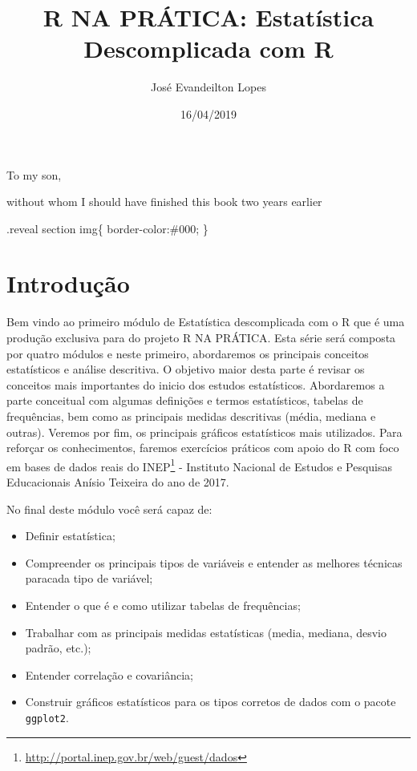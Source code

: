 \documentclass[11pt,]{style/krantz}
\title{R NA PRÁTICA: Estatística Descomplicada com R}
\author{José Evandeilton Lopes}
\date{16/04/2019}
\providecommand{\tightlist}{%
  \setlength{\itemsep}{0pt}\setlength{\parskip}{0pt}}
\renewcommand{\href}[2]{#2\footnote{\url{#1}}}
\theoremstyle{definition}
\theoremstyle{definition}
\theoremstyle{definition}
\theoremstyle{remark}
\begin{document}
\maketitle


\thispagestyle{empty}

\begin{center}
To my son,

without whom I should have finished this book two years earlier
\end{center}

\setlength{\abovedisplayskip}{-5pt}
\setlength{\abovedisplayshortskip}{-5pt}

{
\setcounter{tocdepth}{2}
\tableofcontents
}
\listoftables
\listoffigures
.reveal section img\{
border-color:\#000;
\}

\hypertarget{introducao}{%
\chapter*{Introdução}\label{introducao}}


Bem vindo ao primeiro módulo de Estatística descomplicada com o R que é uma produção exclusiva para do projeto R NA PRÁTICA. Esta série será composta por quatro módulos e neste primeiro, abordaremos os principais conceitos estatísticos e análise descritiva. O objetivo maior desta parte é revisar os conceitos mais importantes do inicio dos estudos estatísticos. Abordaremos a parte conceitual com algumas definições e termos estatísticos, tabelas de frequências, bem como as principais medidas descritivas (média, mediana e outras). Veremos por fim, os principais gráficos estatísticos mais utilizados. Para reforçar os conhecimentos, faremos exercícios práticos com apoio do R com foco em bases de dados reais do \href{http://portal.inep.gov.br/web/guest/dados}{INEP} - Instituto Nacional de Estudos e Pesquisas Educacionais Anísio Teixeira do ano de 2017.

No final deste módulo você será capaz de:

\begin{itemize}
\tightlist
\item
  Definir estatística;
\item
  Compreender os principais tipos de variáveis e entender as melhores técnicas paracada tipo de variável;
\item
  Entender o que é e como utilizar tabelas de frequências;
\item
  Trabalhar com as principais medidas estatísticas (media, mediana, desvio padrão, etc.);
\item
  Entender correlação e covariância;
\item
  Construir gráficos estatísticos para os tipos corretos de dados com o pacote \texttt{ggplot2}.
\end{itemize}
\end{document}
